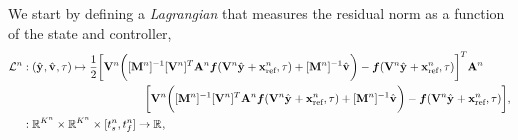 We start by defining a \textit{Lagrangian} that measures the residual norm as a function of the state and controller, 
\begin{equation}\label{eq:obj_controller}
\begin{split}
 \objectiveControlArg{n} &:  (\genstateyDiscreteArgnt{},\controllerDiscreteDumArgnt{},\timeDummy)
\mapsto \frac{1}{2} \bigg[ \basisspaceArg{n} \bigg(  [\massArg{n}]^{-1}\basisspaceTArg{n}
\stweightingMatArgt{n}{t}  \velocity(\basisspaceArg{n} \genstateyDiscreteArgnt{} +
\stateInterceptArg{n},\timeDummy) + [\massArg{n}]^{-1}\controllerDiscreteDumArgnt{} \bigg) -
\velocity(\basisspaceArg{n} \genstateyDiscreteArgnt{} + \stateInterceptArg{n},\timeDummy) \bigg]^T
\stweightingMatArgt{n}{t}  \\ & \hspace{1.5 in}\bigg[ \basisspaceArg{n} \bigg(
[\massArg{n}]^{-1}\basisspaceTArg{n} \stweightingMatArgt{n}{t}\velocity(\basisspaceArg{n}
\genstateyDiscreteArgnt{} + \stateInterceptArg{n},\timeDummy) + [\massArg{n}]^{-1}\controllerDiscreteDumArgnt{}
\bigg) - \velocity( \basisspaceArg{n}  \genstateyDiscreteArgnt{} + \stateInterceptArg{n},\timeDummy ) \bigg]
, \nonumber \\ & : \RR{\romdimArg{n}} \times \RR{\romdimArg{n}} \times [\timeStartArg{n},\timeEndArg{n}] \rightarrow \RR{},
\end{split}
\end{equation}
